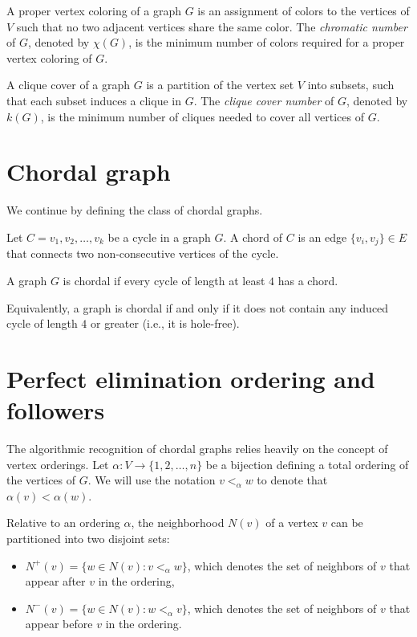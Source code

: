\begin{definition}
A proper vertex coloring of a graph $G$ is an assignment of colors to the vertices of $V$ such that no two adjacent vertices share the same color. The \textit{chromatic number} of $G$, denoted by $\chi(G)$, is the minimum number of colors required for a proper vertex coloring of $G$.
\end{definition}

\begin{definition}
A clique cover of a graph $G$ is a partition of the vertex set $V$ into subsets, such that each subset induces a clique in $G$. The \textit{clique cover number} of $G$, denoted by $k(G)$, is the minimum number of cliques needed to cover all vertices of $G$.
\end{definition}

\section{Chordal graph}

We continue by defining the class of chordal graphs.

\begin{definition}[Chord]
Let $C = v_1, v_2, \dots, v_k$ be a cycle in a graph $G$. A chord of $C$ is an edge $\{v_i, v_j\} \in E$ that connects two non-consecutive vertices of the cycle.
\end{definition}

\begin{definition}
A graph $G$ is chordal if every cycle of length at least $4$ has a chord. 
\end{definition}

Equivalently, a graph is chordal if and only if it does not contain any induced cycle of length $4$ or greater (i.e., it is hole-free). 

\section{Perfect elimination ordering and followers}

The algorithmic recognition of chordal graphs relies heavily on the concept of vertex orderings. Let $\alpha \colon V \to \{1, 2, \dots, n\}$ be a bijection defining a total ordering of the vertices of $G$. We will use the notation $v <_\alpha w$ to denote that $\alpha(v) < \alpha(w)$.

Relative to an ordering $\alpha$, the neighborhood $N(v)$ of a vertex $v$ can be partitioned into two disjoint sets:
\begin{itemize}
    \item $N^+(v) = \{w \in N(v) : v <_\alpha w\}$, which denotes the set of neighbors of $v$ that appear after $v$ in the ordering,
    \item $N^-(v) = \{w \in N(v) : w <_\alpha v\}$, which denotes the set of neighbors of $v$ that appear before $v$ in the ordering.
\end{itemize}

